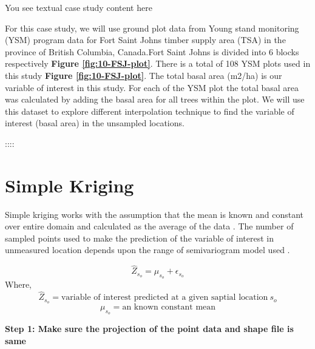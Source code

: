 \documentclass[
]{book}
\begin{document}
You see textual case study content here

For this case study, we will use ground plot data from Young stand monitoring (YSM) program data \citep{province_of_bc_provincial_2018} for Fort Saint Johns timber supply area (TSA) in the province of British Columbia, Canada.Fort Saint Johns is divided into 6 blocks respectively \textbf{Figure \ref{fig:10-FSJ-plot}}. There is a total of 108 YSM plots used in this study \textbf{Figure \ref{fig:10-FSJ-plot}}. The total basal area (m2/ha) is our variable of interest in this study. For each of the YSM plot the total basal area was calculated by adding the basal area for all trees within the plot. We will use this dataset to explore different interpolation technique to find the variable of interest (basal area) in the unsampled locations.

::::

\hypertarget{simple-kriging}{%
\section{Simple Kriging}\label{simple-kriging}}

Simple kriging works with the assumption that the mean is known and constant over entire domain and calculated as the average of the data \citep{wackernagel_multivariate_2002}. The number of sampled points used to make the prediction of the variable of interest in unmeasured location depends upon the range of semivariogram model used \citep{burrough_principles_1998}.

\[\hat{Z}_{s_o}=\mu_{s_o} + \epsilon_{s_o}\]
Where, \[\hat{Z}_{s_o}=\text{variable of interest predicted at a given saptial location}\ s_{o}\]
\[\mu_{s_o}=\text{an known constant mean} \]

\textbf{Step 1: Make sure the projection of the point data and shape file is same}
\end{document}
